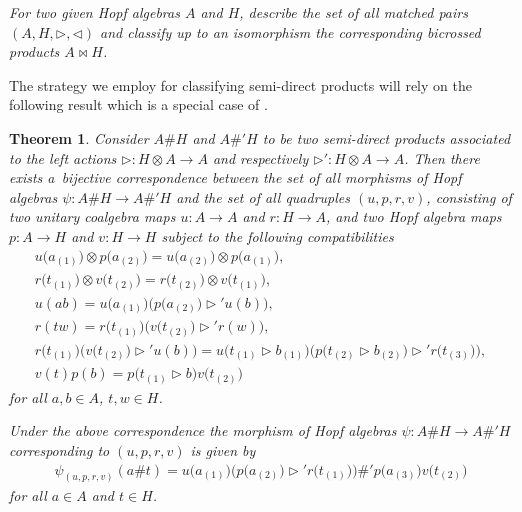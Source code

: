 \documentclass[pdftex]{sigma}
\numberwithin{equation}{section}
\newtheorem{Theorem}{Theorem}[section]
\begin{document}
\textit{For two given Hopf algebras $A$ and $H$, describe the set of all matched pairs $(A, H, \triangleright, \triangleleft)$ and classify
up to an isomorphism the corresponding bicrossed products $A \bowtie H$.}

The strategy we employ for classifying semi-direct products will rely on the following result which is a special case of \cite[Corollary~3.3]{abm}.

\begin{Theorem}\label{toatemorf}
Consider $A \# H$ and $A \#' H$ to be two semi-direct products associated to the left actions $\triangleright \colon H\otimes A \to A$ and
respectively $\triangleright' \colon H\otimes A \to A$. Then there exists a~bijective correspondence between the set of all morphisms of Hopf
algebras $\psi \colon A \# H \to A \# ' H $ and the set of all quadruples $(u, p, r, v)$, consisting of two unitary coalgebra maps $u\colon A \to A$ and $r\colon H \rightarrow A$, and two Hopf algebra maps $p\colon A \to H$ and $v\colon H \rightarrow H$ subject to the following compatibilities
\begin{gather}
u\big(a_{(1)}\big) \otimes p\big(a_{(2)}\big) = u\big(a_{(2)}\big) \otimes p\big(a_{(1)}\big),\label{C1}\\
r\big(t_{(1)}\big) \otimes v\big(t_{(2)}\big) = r\big(t_{(2)}\big) \otimes v\big(t_{(1)}\big),\label{C2}\\
u(ab) = u\big(a_{(1)}\big) \big( p \big(a_{(2)}\big) \triangleright' u(b) \big),\label{C3}\\
r(tw) = r\big(t_{(1)}\big) \big(v\big(t_{(2)}\big) \triangleright' r(w)\big),\label{C4}\\
r\big(t_{(1)}\big) \big(v\big(t_{(2)}\big) \triangleright' u(b) \big) = u \big(t_{(1)} \triangleright b_{(1)}\big) \big( p \big(t_{(2)}
\triangleright b_{(2)}\big) \triangleright' r\big(t_{(3)}\big) \big) ,\label{C5}\\
v(t) p (b)= p \big(t_{(1)} \triangleright b\big) v \big(t_{(2)}\big)\label{C6}
\end{gather}
for all $a, b \in A$, $t, w \in H$.

Under the above correspondence the morphism of Hopf algebras $\psi\colon A \# H \to A \# ' H $ corresponding to $(u, p, r, v)$ is given by
\begin{gather*}%
\psi_{(u, p,r, v)}(a \# t) = u\big(a_{(1)}\big) \big( p\big(a_{(2)}\big) \triangleright' r\big(t_{(1)}\big) \big) \#' p\big(a_{(3)}\big) v\big(t_{(2)}\big)
\end{gather*}
for all $a \in A$ and $t\in H$.
\end{Theorem}
\end{document}
